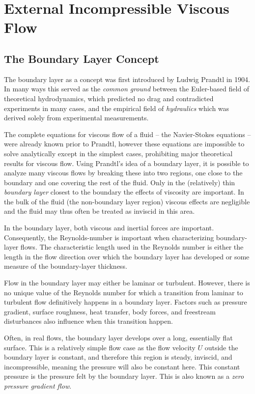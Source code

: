 
\section{External Incompressible Viscous Flow}

\subsection{The Boundary Layer Concept}
The boundary layer as a concept was first introduced by Ludwig Prandtl in 1904.
In many ways this served as the \textit{common ground} between the Euler-based field of theoretical hydrodynamics, which predicted no drag and contradicted experiments in many cases, and the empirical field of \textit{hydraulics} which was derived solely from experimental measurements.

The complete equations for viscous flow of a fluid -- the Navier-Stokes equations -- were already known prior to Prandtl, however these equations are impossible to solve analytically except in the simplest cases, prohibiting major theoretical results for viscous flow.
Using Prandtl's idea of a boundary layer, it is possible to analyze many viscous flows by breaking these into two regions, one close to the boundary and one covering the rest of the fluid.
Only in the (relatively) thin \textit{boundary layer} closest to the boundary the effects of viscosity are important.
In the bulk of the fluid (the non-boundary layer region) viscous effects are negligible and the fluid may thus often be treated as inviscid in this area.

In the boundary layer, both viscous and inertial forces are important.
Consequently, the Reynolds-number is important when characterizing boundary-layer flows.
The characteristic length used in the Reynolds number is either the length in the flow direction over which the boundary layer has developed or some measure of the boundary-layer thickness.

Flow in the boundary layer may either be laminar or turbulent.
However, there is no unique value of the Reynolds number for which a transition from laminar to turbulent flow definitively happens in a boundary layer.
Factors such as pressure gradient, surface roughness, heat transfer, body forces, and freestream disturbances also influence when this transition happen.

Often, in real flows, the boundary layer develops over a long, essentially flat surface.
This is a relatively simple flow case as the flow velocity $U$ outside the boundary layer is constant, and therefore this region is steady, inviscid, and incompressible, meaning the pressure will also be constant here.
This constant pressure is the pressure felt by the boundary layer.
This is also known as a \textit{zero pressure gradient flow}.

